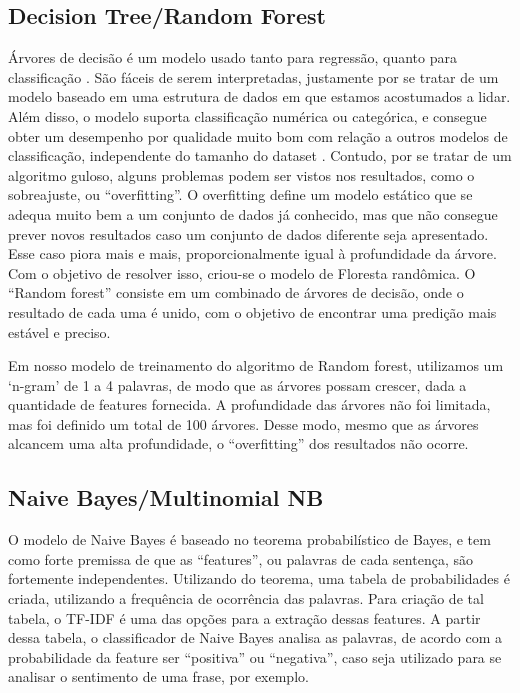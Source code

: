 \subsection{Decision Tree/Random Forest}

Árvores de decisão é um modelo usado tanto para regressão, quanto para classificação \cite{decision-tree}. São fáceis de serem interpretadas, justamente por se tratar de um modelo baseado em uma estrutura de dados em que estamos acostumados a lidar. Além disso, o modelo suporta classificação numérica ou categórica, e consegue obter um desempenho por qualidade muito bom com relação a outros modelos de classificação, independente do tamanho do dataset \cite{performance-comparison}. Contudo, por se tratar de um algoritmo guloso, alguns problemas podem ser vistos nos resultados, como o sobreajuste, ou “overfitting”. O overfitting define um modelo estático que se adequa muito bem a um conjunto de dados já conhecido, mas que não consegue prever novos resultados caso um conjunto de dados diferente seja apresentado. Esse caso piora mais e mais, proporcionalmente igual à profundidade da árvore.  Com o objetivo de resolver isso, criou-se o modelo de Floresta randômica. O “Random forest” consiste em um combinado de árvores de decisão, onde o resultado de cada uma é unido, com o objetivo de encontrar uma predição mais estável e preciso.

Em nosso modelo de treinamento do algoritmo de Random forest, utilizamos um ‘n-gram’ de 1 a 4 palavras, de modo que as árvores possam crescer, dada a quantidade de features fornecida. A profundidade das árvores não foi limitada, mas foi definido um total de 100 árvores. Desse modo, mesmo que as árvores alcancem uma alta profundidade, o “overfitting” dos resultados não ocorre.

\subsection{Naive Bayes/Multinomial NB}
O modelo de Naive Bayes é baseado no teorema probabilístico de Bayes, e tem como forte premissa de que as “features”, ou palavras de cada sentença, são fortemente independentes. Utilizando do teorema, uma tabela de probabilidades é criada, utilizando a frequência de ocorrência das palavras. Para criação de tal tabela, o TF-IDF é uma das opções para a extração dessas features. A partir dessa tabela, o classificador de Naive Bayes analisa as palavras, de acordo com a probabilidade da feature ser “positiva” ou “negativa”, caso seja utilizado para se analisar o sentimento de uma frase, por exemplo.


